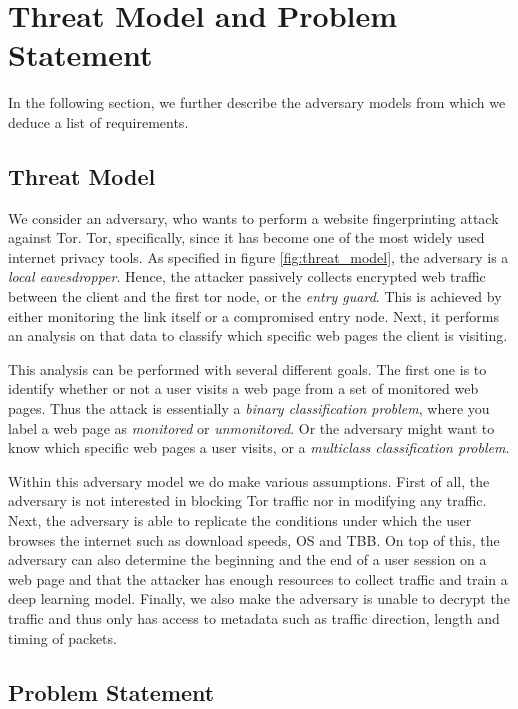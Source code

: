 \chapter{Threat Model and Problem Statement}

In the following section, we further describe the adversary models from which we deduce a list of requirements.

\section{Threat Model} \label{sec:threat-model}

We consider an adversary, who wants to perform a website fingerprinting attack against Tor.
Tor, specifically, since it has become one of the most widely used internet privacy tools.
As specified in figure \ref{fig:threat_model}, the adversary is a \textit{local eavesdropper}.
Hence, the attacker passively collects encrypted web traffic between the client and the first tor node, or the \textit{entry guard}.
This is achieved by either monitoring the link itself or a compromised entry node.
Next, it performs an analysis on that data to classify which specific web pages the client is visiting.

This analysis can be performed with several different goals.
The first one is to identify whether or not a user visits a web page from a set of monitored web pages.
Thus the attack is essentially a \textit{binary classification problem}, where you label a web page as \textit{monitored} or \textit{unmonitored}.
Or the adversary might want to know which specific web pages a user visits, or a \textit{multiclass classification problem}.

Within this adversary model we do make various assumptions.
First of all, the adversary is not interested in blocking Tor traffic nor in modifying any traffic.
Next, the adversary is able to replicate the conditions under which the user browses the internet such as download speeds, OS and TBB.
On top of this, the adversary can also determine the beginning and the end of a user session on a web page and that the attacker has enough resources to collect traffic and train a deep learning model.
Finally, we also make the adversary is unable to decrypt the traffic and thus only has access to metadata such as traffic direction, length and timing of packets.

\section{Problem Statement}

